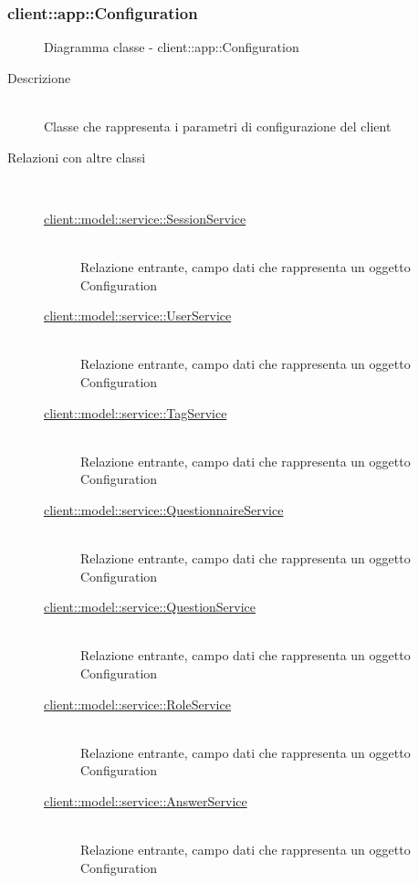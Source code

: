 \subsubsection[Configuration]{client::app::Configuration}
\begin{figure}[H]
	\centering
	\caption{Diagramma classe - client::app::Configuration}
\end{figure}\begin{description}
\item[Descrizione] \hfill \\
Classe che rappresenta i parametri di configurazione del client
\item[Relazioni con altre classi] \hfill \\
\vspace{-7mm}
\begin{description}
	\item[\hyperlink{client::model::service::SessionService}{client::model::service::SessionService}] \hfill \\
	Relazione entrante, campo dati che rappresenta un oggetto Configuration
	\item[\hyperlink{client::model::service::UserService}{client::model::service::UserService}] \hfill \\
	Relazione entrante, campo dati che rappresenta un oggetto Configuration
	\item[\hyperlink{client::model::service::TagService}{client::model::service::TagService}] \hfill \\
	Relazione entrante, campo dati che rappresenta un oggetto Configuration
	\item[\hyperlink{client::model::service::QuestionnaireService}{client::model::service::QuestionnaireService}] \hfill \\
	Relazione entrante, campo dati che rappresenta un oggetto Configuration
	\item[\hyperlink{client::model::service::QuestionService}{client::model::service::QuestionService}] \hfill \\
	Relazione entrante, campo dati che rappresenta un oggetto Configuration
	\item[\hyperlink{client::model::service::RoleService}{client::model::service::RoleService}] \hfill \\
	Relazione entrante, campo dati che rappresenta un oggetto Configuration
	\item[\hyperlink{client::model::service::AnswerService}{client::model::service::AnswerService}] \hfill \\
	Relazione entrante, campo dati che rappresenta un oggetto Configuration
\end{description}


\end{description}
